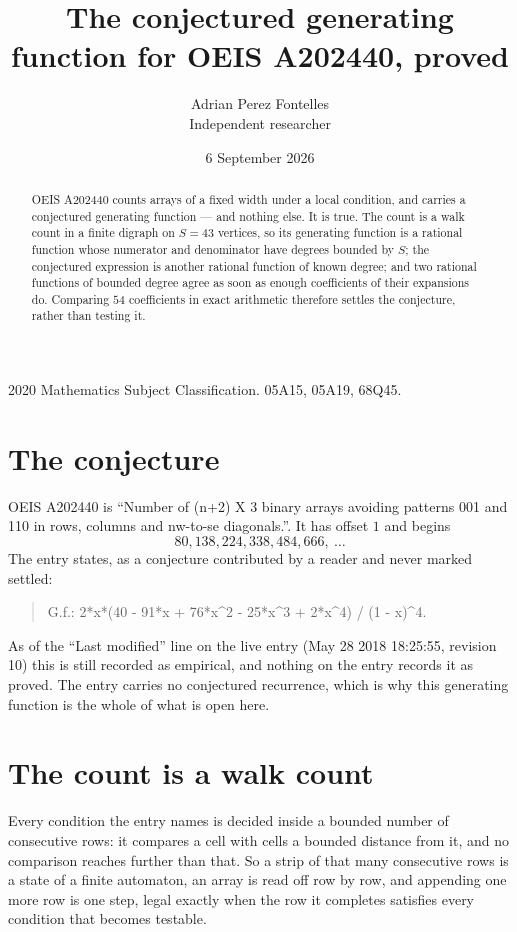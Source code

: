 \documentclass[11pt,a4paper]{article}
\title{The conjectured generating function for OEIS A202440, proved}
\author{Adrian Perez Fontelles\\ \small Independent researcher}
\date{6 September 2026}
\theoremstyle{plain}
\theoremstyle{definition}
\begin{document}
\maketitle

\begin{abstract}
OEIS A202440 counts arrays of a fixed width under a local condition, and carries a conjectured
generating function --- and nothing else. It is true. The count is a walk count in a finite
digraph on $S=43$ vertices, so its generating function is a rational function whose numerator
and denominator have degrees bounded by $S$; the conjectured expression is another rational
function of known degree; and two rational functions of bounded degree agree as soon as enough
coefficients of their expansions do. Comparing $54$ coefficients in exact arithmetic
therefore settles the conjecture, rather than testing it.
\end{abstract}

\noindent\small 2020 Mathematics Subject Classification. 05A15, 05A19, 68Q45.\normalsize

\section{The conjecture}

OEIS A202440 is ``Number of (n+2) X 3 binary arrays avoiding patterns 001 and 110 in rows, columns and nw-to-se diagonals.''. It has offset $1$ and begins
\[
80, 138, 224, 338, 484, 666,\ \dots
\]
The entry states, as a conjecture contributed by a reader and never marked settled:
\begin{quote}
G.f.: 2*x*(40 - 91*x + 76*x\^{}2 - 25*x\^{}3 + 2*x\^{}4) / (1 - x)\^{}4.
\end{quote}
As of the ``Last modified'' line on the live entry (May 28 2018 18:25:55, revision 10) this is still
recorded as empirical, and nothing on the entry records it as proved. The entry carries no
conjectured recurrence, which is why this generating function is the whole of what is open
here.

\section{The count is a walk count}

Every condition the entry names is decided inside a bounded number of consecutive rows: it
compares a cell with cells a bounded distance from it, and no comparison reaches further than
that. So a strip of that many consecutive rows is a state of a finite automaton, an array is
read off row by row, and appending one more row is one step, legal exactly when the row it
completes satisfies every condition that becomes testable.
\end{document}
